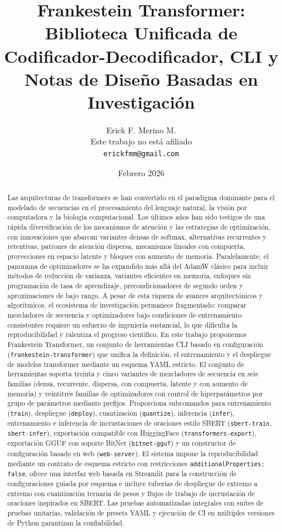 \documentclass[11pt,a4paper]{article}
\title{Frankestein Transformer:\\Biblioteca Unificada de Codificador-Decodificador, CLI y Notas de Diseño Basadas en Investigación}
\author{
Erick F. Merino M. \\
Este trabajo no está afiliado \\
\texttt{erickfmm@gmail.com}
}
\date{Febrero 2026}
\begin{document}
\maketitle

\begin{abstract}
Las arquitecturas de transformers se han convertido en el paradigma dominante para el modelado de secuencias en el procesamiento del lenguaje natural, la visión por computadora y la biología computacional. Los últimos años han sido testigos de una rápida diversificación de los mecanismos de atención y las estrategias de optimización, con innovaciones que abarcan variantes densas de softmax, alternativas recurrentes y retentivas, patrones de atención dispersa, mecanismos lineales con compuerta, proyecciones en espacio latente y bloques con aumento de memoria. Paralelamente, el panorama de optimizadores se ha expandido más allá del AdamW clásico para incluir métodos de reducción de varianza, variantes eficientes en memoria, enfoques sin programación de tasa de aprendizaje, precondicionadores de segundo orden y aproximaciones de bajo rango. A pesar de esta riqueza de avances arquitectónicos y algorítmicos, el ecosistema de investigación permanece fragmentado: comparar mezcladores de secuencia y optimizadores bajo condiciones de entrenamiento consistentes requiere un esfuerzo de ingeniería sustancial, lo que dificulta la reproducibilidad y ralentiza el progreso científico. En este trabajo proponemos Frankestein Transformer, un conjunto de herramientas CLI basado en configuración (\texttt{frankestein-transformer}) que unifica la definición, el entrenamiento y el despliegue de modelos transformer mediante un esquema YAML estricto. El conjunto de herramientas soporta treinta y cinco variantes de mezcladores de secuencia en seis familias (densa, recurrente, dispersa, con compuerta, latente y con aumento de memoria) y veintitrés familias de optimizadores con control de hiperparámetros por grupo de parámetros mediante prefijos. Proporciona subcomandos para entrenamiento (\texttt{train}), despliegue (\texttt{deploy}), cuantización (\texttt{quantize}), inferencia (\texttt{infer}), entrenamiento e inferencia de incrustaciones de oraciones estilo SBERT (\texttt{sbert-train}, \texttt{sbert-infer}), exportación compatible con HuggingFace (\texttt{transformers-export}), exportación GGUF con soporte BitNet (\texttt{bitnet-gguf}) y un constructor de configuración basado en web (\texttt{web-server}). El sistema impone la reproducibilidad mediante un contrato de esquema estricto con restricciones \texttt{additionalProperties: false}, ofrece una interfaz web basada en Streamlit para la construcción de configuraciones guiada por esquema e incluye tuberías de despliegue de extremo a extremo con cuantización ternaria de pesos y flujos de trabajo de incrustación de oraciones inspirados en SBERT. Las pruebas automatizadas integrales con suites de pruebas unitarias, validación de presets YAML y ejecución de CI en múltiples versiones de Python garantizan la confiabilidad.
\end{abstract}
\end{document}
